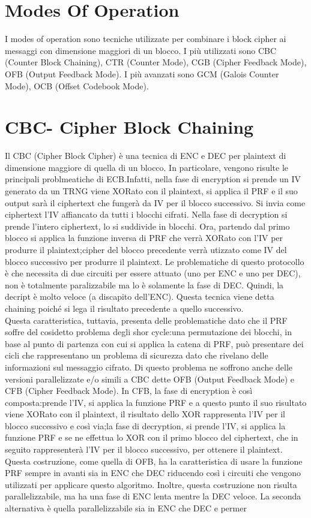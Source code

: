 \documentclass{article}
\begin{document}
\section{Modes Of Operation}
I modes of operation sono tecniche utilizzate per combinare i block cipher ai messaggi con dimensione maggiori di un blocco.\newline
I più utilizzati sono CBC (Counter Block Chaining), CTR (Counter Mode), CGB (Cipher Feedback Mode), OFB (Output Feedback Mode)\@. I più avanzati sono GCM (Galois Counter Mode), OCB (Offset Codebook Mode)\@.
\section{CBC- Cipher Block Chaining}%
Il CBC (Cipher Block Cipher) è una tecnica di ENC e DEC per plaintext di dimensione maggiore di quella di un blocco. In particolare, vengono risulte le principali problmeatiche di ECB\@.Infatti, nella fase di encryption si prende un IV generato da un TRNG viene XORato con il plaintext, si applica il PRF e il suo output sarà il ciphertext che fungerà da IV per il blocco successivo. Si invia come ciphertext l'IV affiancato da tutti i blocchi cifrati\@. Nella fase di decryption si prende l'intero ciphertext, lo si suddivide in blocchi\@. Ora, partendo dal primo blocco si applica la funzione inversa di PRF che verrà XORato con l'IV per produrre il plaintext;\@il cipher del blocco precedente verrà utizzato come IV del blocco successivo per produrre il plaintext\@. Le problematiche di questo protocollo è che necessita di due circuiti per essere attuato (uno per ENC e uno per DEC), non è totalmente paralizzabile ma lo è solamente la fase di DEC\@. Quindi, la decript è molto veloce (a discapito dell'ENC)\@.\newline
Questa tecnica viene detta chaining poiché si lega il risultato precedente a quello successivo\@.\\
Questa caratteristica, tuttavia, presenta delle problematiche dato che il PRF soffre del cosidetto problema degli shor cycle:\@presa una permutazione dei blocchi, in base al punto di partenza con cui si applica la catena di PRF, può presentare dei cicli che rappresentano un problema di sicurezza dato che rivelano delle informazioni sul messaggio cifrato\@.\newline
Di questo problema ne soffrono anche delle versioni parallelizzate e/o simili a CBC dette OFB (Output Feedback Mode) e CFB (Cipher Feedback Mode)\@.\newline
In CFB, la fase di encryption è così composta:\@si prende l'IV, si applica la funzione PRF e a questo punto il suo risultato viene XORato con il plaintext, il risultato dello XOR rappresenta l'IV per il blocco successivo e così via;\@per la fase di decryption, si prende l'IV, si applica la funzione PRF e se ne effettua lo XOR con il primo blocco del ciphertext, che in seguito rappresenterà l'IV per il blocco successivo, per ottenere il plaintext\@. Questa costruzione, come quella di OFB, ha la caratteristica di usare la funzione PRF sempre in avanti sia in ENC che DEC riducendo così i circuiti che vengono utilizzati per applicare questo algoritmo\@. Inoltre, questa costruzione non risulta parallelizzabile, ma ha una fase di ENC lenta mentre la DEC veloce\@.\newline
La seconda alternativa è quella parallelizzabile sia in ENC che DEC e permer
\end{document}
